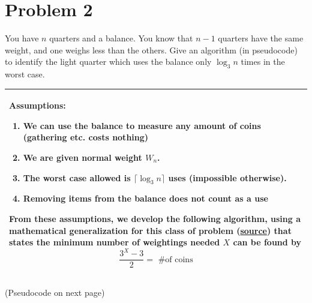 \documentclass[10pt]{article}
\newenvironment{answer}
    {\begin{center}
    \begin{tabular}{|p{1\textwidth}|}
    \hline
    }
    { 
    \\\hline
    \end{tabular} 
    \end{center}
    }
\begin{document}
\section*{Problem 2}
You have $n$ quarters and a balance. You know that $n-1$ quarters have
the same weight, and one weighs less than the others. Give an algorithm
(in pseudocode) to identify the light quarter which uses the balance only
$\log_{3}n$ times in the worst case.
\begin{answer}
  Assumptions:
  \begin{enumerate}
  \item We can use the balance to measure any amount of coins (gathering etc. costs nothing)
  \item We are given normal weight $W_n$.
  \item The worst case allowed is $\lceil\log_{3}n\rceil$ uses (impossible otherwise).
  \item Removing items from the balance \textbf{does not count as a use}
  \end{enumerate}
  From these assumptions, we develop the following algorithm, using a mathematical generalization for this class of problem (\href{https://en.wikipedia.org/wiki/Balance_puzzle}{source}) that states the minimum number of weightings needed $X$ can be found by 
\[ \frac{3^X-3}{2} = \textrm{ \# of coins}\]
\end{answer}
\begin{center}
  (Pseudocode on next page)
\end{center}
\end{document}
